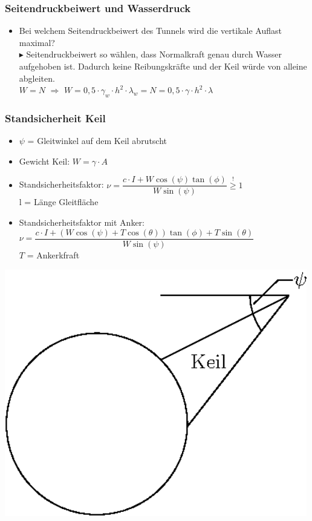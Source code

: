\documentclass[fleqn,twoside]{article}
\begin{document}
\subsubsection{Seitendruckbeiwert und Wasserdruck}
\begin{itemize}
    \item Bei welchem Seitendruckbeiwert des Tunnels wird die vertikale Auflast maximal?\\
    $\blacktriangleright$ Seitendruckbeiwert so wählen, dass Normalkraft genau durch Wasser aufgehoben ist. Dadurch keine Reibungskräfte und der Keil würde von alleine abgleiten.\\
            $W=N$ $\Rightarrow$ $W=0,5\cdot \gamma_w \cdot h^2 \cdot \lambda_w = N = 0,5 \cdot \gamma \cdot h^2 \cdot \lambda$
\end{itemize}


\subsubsection{Standsicherheit Keil}
\begin{minipage}{0.72\textwidth}
\begin{itemize}
	\item $\psi$ = Gleitwinkel auf dem Keil abrutscht
	\item Gewicht Keil: $W = \gamma \cdot A$
	\item Standsicherheitsfaktor: $\nu = \dfrac{c \cdot I + W\cos(\psi) \tan(\phi)}{W \sin(\psi)} \overset{!}{\geq} 1$\\
        l = Länge Gleitfläche
    \item Standsicherheitsfaktor mit Anker:\vspace{5pt}\\
    $\nu = \dfrac{c \cdot I + (W\cos(\psi) + T\cos(\theta))\tan(\phi) +T\sin(\theta)}{W \sin(\psi)}$\\
    $T$ = Ankerkfraft
\end{itemize}
\end{minipage}
\begin{minipage}{0.27\textwidth}
    \includegraphics[width=0.99\textwidth]{Grafiken/Abrutschen_Keil.eps}
\end{minipage}
\end{document}
